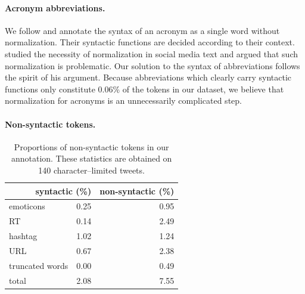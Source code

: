 \documentclass[11pt,a4paper]{article}
\begin{document}
\paragraph{Acronym abbreviations.}  %
We follow \citet{kong-EtAl:2014:EMNLP2014} and annotate the
syntax of an acronym as a single word without normalization. Their syntactic functions
are decided according to their context. \citet{eisenstein:2013:NAACL-HLT} studied the necessity of normalization
in social media text and argued that such normalization is problematic.
Our solution to the syntax of abbreviations follows the spirit of his argument. Because abbreviations which clearly carry
syntactic functions only constitute 0.06\% of the tokens in our
dataset, we believe that normalization for acronyms is an unnecessarily complicated
step.


\paragraph{Non-syntactic tokens.}  
\begin{table}
\centering
\begin{tabular}{lrr}
\multicolumn{2}{r}{syntactic (\%)} & non-syntactic (\%)\\ \hline
emoticons & 0.25 & 0.95 \\
RT & 0.14 & 2.49\\
hashtag & 1.02 & 1.24 \\
URL & 0.67 & 2.38 \\
truncated words & 0.00 & 0.49 \\
 \hline
 total & 2.08 & 7.55 \\
\end{tabular}
\caption{Proportions of non-syntactic tokens in our annotation. %
These statistics are obtained on 140 character--limited tweets. \label{tbl:non-synt-prop}}
\end{table}
\end{document}

